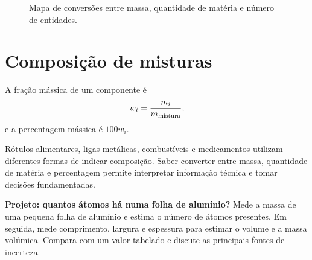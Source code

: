 \documentclass[11pt,a4paper,oneside]{book}
\begin{document}
\begin{figure}[H]
\centering
{}
\caption{Mapa de conversões entre massa, quantidade de matéria e número de entidades.}
\end{figure}

\section{Composição de misturas}
A fração mássica de um componente é
\[
w_i=\frac{m_i}{m_{\rm mistura}},
\]
e a percentagem mássica é $100w_i$.

\begin{mundo}
Rótulos alimentares, ligas metálicas, combustíveis e medicamentos utilizam diferentes formas de indicar composição. Saber converter entre massa, quantidade de matéria e percentagem permite interpretar informação técnica e tomar decisões fundamentadas.
\end{mundo}

\begin{stem}
\textbf{Projeto: quantos átomos há numa folha de alumínio?} Mede a massa de uma pequena folha de alumínio e estima o número de átomos presentes. Em seguida, mede comprimento, largura e espessura para estimar o volume e a massa volúmica. Compara com um valor tabelado e discute as principais fontes de incerteza.
\end{stem}
\end{document}
